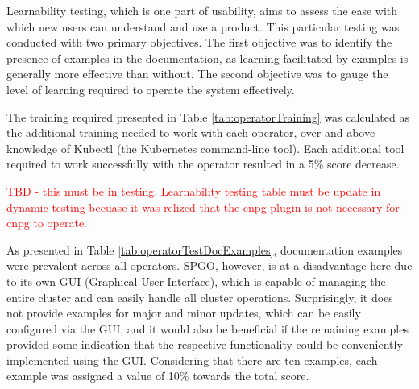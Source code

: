 Learnability testing, which is one part of usability, aims to assess the ease with which new users can understand and use a product. This particular testing was conducted with two primary objectives. The first objective was to identify the presence of examples in the documentation, as learning facilitated by examples is generally more effective than without. The second objective was to gauge the level of learning required to operate the system effectively.


The training required presented in Table \ref{tab:operatorTraining} was calculated as the additional training needed to work with each operator, over and above knowledge of Kubectl (the Kubernetes command-line tool).
Each additional tool required to work successfully with the operator resulted in a 5\% score decrease.

\textcolor{red}{TBD - this must be in testing. Learnability testing table must be update in dynamic testing becuase it was relized that the cnpg plugin is not necessary for cnpg to operate.}


As presented in Table \ref{tab:operatorTestDocExamples}, documentation examples were prevalent across all operators. SPGO, however, is at a disadvantage here due to its own GUI (Graphical User Interface), which is capable of managing the entire cluster and can easily handle all cluster operations. Surprisingly, it does not provide examples for major and minor updates, which can be easily configured via the GUI, and it would also be beneficial if the remaining examples provided some indication that the respective functionality could be conveniently implemented using the GUI. Considering that there are ten examples, each example was assigned a value of 10\% towards the total score.




